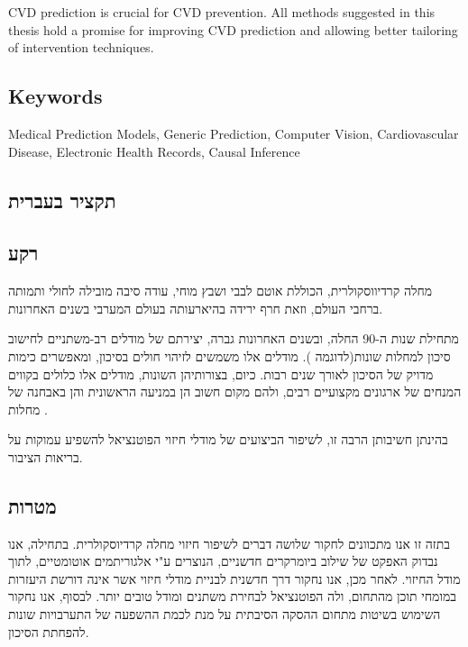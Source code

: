 \documentclass[a4paper,12pt]{article}
\begin{document}
		CVD prediction is crucial for CVD prevention. All methods suggested in this thesis hold a promise for improving CVD prediction and allowing better tailoring of intervention techniques.
		
		\subsection{Keywords}
		
		Medical Prediction Models, Generic Prediction, Computer Vision, Cardiovascular Disease, Electronic Health Records, Causal Inference
	
	\begin{hebrew}	
	\section{\texthebrew{תקציר בעברית}}
	
		\subsection{\texthebrew{רקע}}
		
		מחלה קרדיווסקולרית, הכוללת אוטם לבבי ושבץ מוחי, עודה סיבה מובילה לחולי ותמותה\cite{ODonnell2016} ברחבי העולם, וזאת חרף ירידה בהיארעותה בעולם המערבי בשנים האחרונות\cite{Koton2014,Vangen-Loenne2017}.

				מתחילת שנות ה-90 החלה, ובשנים האחרונות גברה, יצירתם של מודלים רב-משתניים לחישוב סיכון למחלות שונות(לדוגמה \cite{Wilson1998,Conroy2003,DAgostino2008}). מודלים אלו משמשים לזיהוי חולים בסיכון, ומאפשרים כימות מדויק של הסיכון לאורך שנים רבות\cite{Goff2014}. כיום, בצורותיהן השונות, מודלים אלו כלולים בקווים המנחים של ארגונים מקצועיים רבים, ולהם מקום חשוב הן במניעה הראשונית והן באבחנה של מחלות \cite{Graham2007,Goff2014}.
				
				בהינתן חשיבותן הרבה זו, לשיפור הביצועים של מודלי חיזוי הפוטנציאל להשפיע עמוקות על בריאות הציבור.
			
		\subsection{\texthebrew{מטרות}}
		
				בתזה זו אנו מתכוונים לחקור שלושה דברים לשיפור חיזוי מחלה קרדיוסקולרית. בתחילה, אנו נבדוק האפקט של שילוב ביומרקרים חדשניים, הנוצרים ע"י אלגוריתמים אוטומטיים, לתוך מודל החיזוי. לאחר מכן, אנו נחקור דרך חדשנית לבניית מודלי חיזוי אשר אינה דורשת היעזרות במומחי תוכן מהתחום, ולה הפוטנציאל לבחירת משתנים ומודל טובים יותר. לבסוף, אנו נחקור השימוש בשיטות מתחום ההסקה הסיבתית על מנת לכמת ההשפעה של התערבויות שונות להפחתת הסיכון.
				

\end{hebrew}
\end{document}

